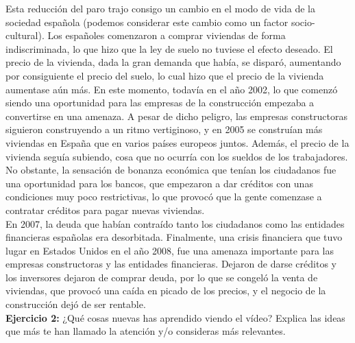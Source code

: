 \documentclass[11pt]{article}
\theoremstyle{plain}
\theoremstyle{definition}
\begin{document}
Esta reducción del paro trajo consigo un cambio en el modo de vida de
la sociedad española (podemos considerar este cambio como un factor
socio-cultural). Los españoles comenzaron a comprar viviendas de forma
indiscriminada, lo que hizo que la ley de suelo no tuviese el efecto
deseado. El precio de la vivienda, dada la gran demanda que había, se
disparó, aumentando por consiguiente el precio del suelo, lo cual hizo
que el precio de la vivienda aumentase aún más. En este momento,
todavía en el año 2002, lo que comenzó siendo una oportunidad para las
empresas de la construcción empezaba a convertirse en una amenaza. A
pesar de dicho peligro, las empresas constructoras siguieron
construyendo a un ritmo vertiginoso, y en 2005 se construían más
viviendas en España que en varios países europeos juntos. Además, el
precio de la vivienda seguía subiendo, cosa que no ocurría con los
sueldos de los trabajadores. No obstante, la sensación de bonanza
económica que tenían los ciudadanos fue una oportunidad para los
bancos, que empezaron a dar créditos con unas condiciones muy poco
restrictivas, lo que provocó que la gente comenzase a contratar
créditos
para pagar nuevas viviendas.\\

En 2007, la deuda que habían contraído tanto los ciudadanos como las
entidades financieras españolas era desorbitada. Finalmente, una
crisis financiera que tuvo lugar en Estados Unidos en el año 2008, fue
una amenaza importante para las empresas constructoras y las entidades
financieras. Dejaron de darse créditos y los inversores dejaron de
comprar deuda, por lo que se congeló la venta de viviendas, que provocó
una caída en picado de los precios, y el negocio de la construcción
dejó de ser rentable.\\

\textbf{Ejercicio 2:} ¿Qué cosas nuevas has aprendido viendo el vídeo?
Explica las ideas que más te han llamado la atención y/o consideras
más relevantes.
\end{document}
